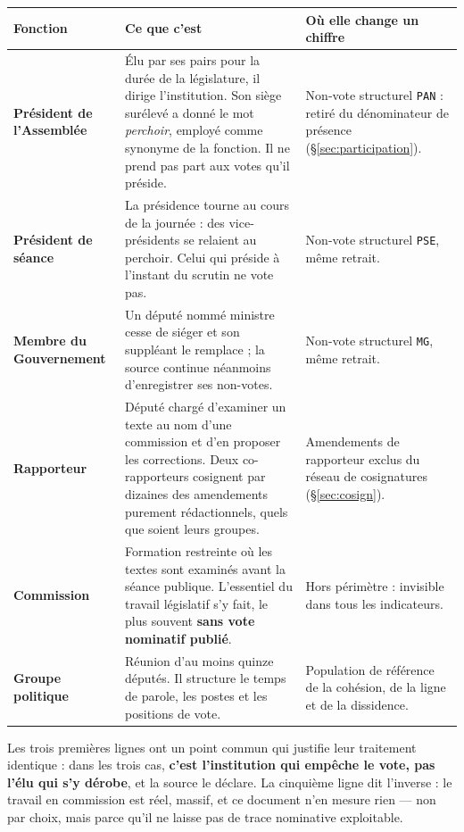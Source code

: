 \documentclass[11pt,a4paper]{article}
\newcommand{\code}[1]{\texttt{#1}}
\begin{document}
\begin{center}
\begin{tabular}{>{\raggedright\arraybackslash}p{.22\linewidth}p{.40\linewidth}p{.30\linewidth}}
\toprule
Fonction & Ce que c'est & Où elle change un chiffre \\
\midrule
\textbf{Président de l'Assemblée} & Élu par ses pairs pour la durée de la législature, il dirige l'institution. Son siège surélevé a donné le mot \emph{perchoir}, employé comme synonyme de la fonction. Il ne prend pas part aux votes qu'il préside. & Non-vote structurel \code{PAN} : retiré du dénominateur de présence (§\ref{sec:participation}). \\
\addlinespace
\textbf{Président de séance} & La présidence tourne au cours de la journée : des vice-présidents se relaient au perchoir. Celui qui préside à l'instant du scrutin ne vote pas. & Non-vote structurel \code{PSE}, même retrait. \\
\addlinespace
\textbf{Membre du Gouvernement} & Un député nommé ministre cesse de siéger et son suppléant le remplace ; la source continue néanmoins d'enregistrer ses non-votes. & Non-vote structurel \code{MG}, même retrait. \\
\addlinespace
\textbf{Rapporteur} & Député chargé d'examiner un texte au nom d'une commission et d'en proposer les corrections. Deux co-rapporteurs cosignent par dizaines des amendements purement rédactionnels, quels que soient leurs groupes. & Amendements de rapporteur exclus du réseau de cosignatures (§\ref{sec:cosign}). \\
\addlinespace
\textbf{Commission} & Formation restreinte où les textes sont examinés avant la séance publique. L'essentiel du travail législatif s'y fait, le plus souvent \textbf{sans vote nominatif publié}. & Hors périmètre : invisible dans tous les indicateurs. \\
\addlinespace
\textbf{Groupe politique} & Réunion d'au moins quinze députés. Il structure le temps de parole, les postes et les positions de vote. & Population de référence de la cohésion, de la ligne et de la dissidence. \\
\bottomrule
\end{tabular}
\end{center}

Les trois premières lignes ont un point commun qui justifie leur traitement
identique : dans les trois cas, \textbf{c'est l'institution qui empêche le vote,
pas l'élu qui s'y dérobe}, et la source le déclare. La cinquième ligne dit
l'inverse : le travail en commission est réel, massif, et ce document n'en
mesure rien — non par choix, mais parce qu'il ne laisse pas de trace nominative
exploitable.
\end{document}
